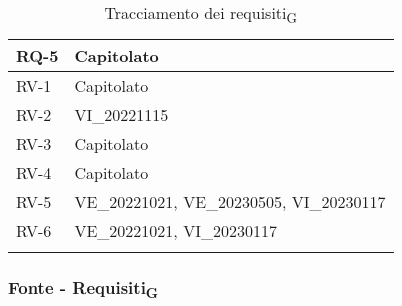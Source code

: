 \begin{center}
\begin{xltabular}{\textwidth}{|X|X|}
		\hline
		RQ-5 & Capitolato\\
		\hline
		RV-1 & Capitolato\\
		\hline
		RV-2 & VI\_20221115\\
		\hline
		RV-3 & Capitolato\\
		\hline
		RV-4 & Capitolato\\
		\hline
		RV-5 & VE\_20221021, VE\_20230505, VI\_20230117\\
		\hline
		RV-6 & VE\_20221021, VI\_20230117\\
		\hline
		\caption{Tracciamento dei requisiti\textsubscript{G}}
	\end{xltabular}
\end{center}

\subsubsection{Fonte - Requisiti\textsubscript{G}}
